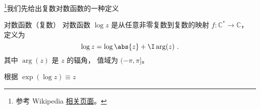 

\footnote{参考 Wikipedia \href{https://en.wikipedia.org/wiki/Complex_logarithm}{相关页面}。}我们先给出复数对数函数的一种定义
\begin{definition}{对数函数（复数）}
对数函数 $\log z$ 是从任意非零复数到复数的映射 $f:\mathbb C^*\to \mathbb C$， 定义为
\begin{equation}
\log z = \log\abs{z} + \I \arg(z)~.
\end{equation}
其中 $\arg(z)$ 是 $z$ 的辐角， 值域为 $(-\pi, \pi]$。
\end{definition}

根据
$\exp(\log z) \equiv z$
